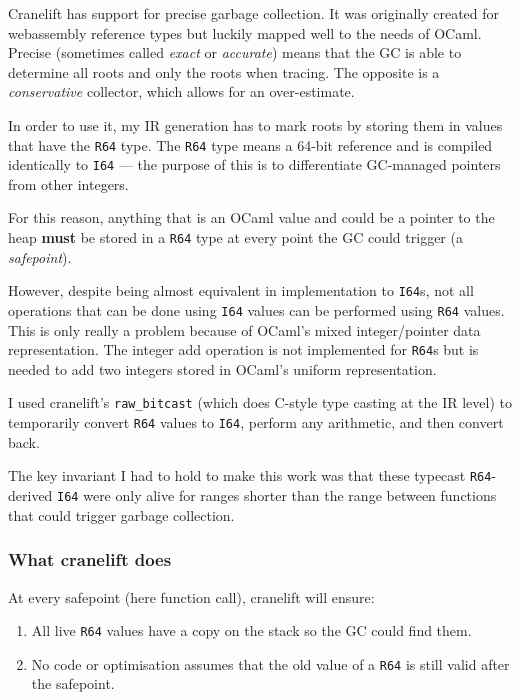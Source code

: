 Cranelift has support for precise garbage collection. It was originally created for webassembly
reference types but luckily mapped well to the needs of OCaml. Precise (sometimes called
\emph{exact} or \emph{accurate}) means that the GC is able to determine all roots and only the
roots
when tracing. The opposite is a \emph{conservative} collector, which allows for an over-estimate.

In order to use it, my IR generation has to mark roots by storing them in values that have the
\texttt{R64} type. The \texttt{R64} type means a 64-bit reference and is compiled identically to
\texttt{I64} --- the purpose of this is to differentiate GC-managed pointers from other integers.

For this reason, anything that is an OCaml value and could be a pointer to the heap \textbf{must}
be stored in a \texttt{R64} type at every point the GC could trigger (a \emph{safepoint}).

However, despite being almost equivalent in implementation to \texttt{I64}s, not all operations
that
can be done using \texttt{I64} values can be performed using \texttt{R64} values. This is only
really a
problem because of OCaml's mixed integer/pointer data representation. The integer add operation is
not
implemented for \texttt{R64}s but is needed to add two integers stored in OCaml's uniform
representation.

I used cranelift's \texttt{raw\_bitcast} (which does C-style type casting at the IR level) to
temporarily convert \texttt{R64} values to \texttt{I64}, perform any arithmetic, and then convert
back.

The key invariant I had to hold to make this work was that these typecast \texttt{R64}-derived
\texttt{I64} were only alive for ranges shorter than the range between functions that could
trigger
garbage collection.

\subsubsection{What cranelift does}

At every safepoint (here function call), cranelift will ensure:

\begin{enumerate}
      \item All live \texttt{R64} values have a copy on the stack so the GC could find them.
      \item No code or optimisation assumes that the old value of a \texttt{R64} is still valid
            after the safepoint.
\end{enumerate}

